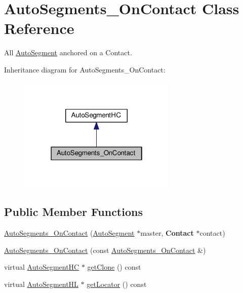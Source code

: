 \hypertarget{classKatabatic_1_1AutoSegments__OnContact}{}\section{Auto\+Segments\+\_\+\+On\+Contact Class Reference}
\label{classKatabatic_1_1AutoSegments__OnContact}


All \hyperlink{classKatabatic_1_1AutoSegment}{Auto\+Segment} anchored on a Contact.  




Inheritance diagram for Auto\+Segments\+\_\+\+On\+Contact\+:\nopagebreak
\begin{figure}[H]
\begin{center}
\leavevmode
\includegraphics[width=214pt]{classKatabatic_1_1AutoSegments__OnContact__inherit__graph}
\end{center}
\end{figure}
\subsection*{Public Member Functions}
\begin{DoxyCompactItemize}
\item 
\hyperlink{classKatabatic_1_1AutoSegments__OnContact_af3f727d0c0fe394da508f52a6c9e4b90}{Auto\+Segments\+\_\+\+On\+Contact} (\hyperlink{classKatabatic_1_1AutoSegment}{Auto\+Segment} $\ast$master, \textbf{ Contact} $\ast$contact)
\item 
\hyperlink{classKatabatic_1_1AutoSegments__OnContact_ab6ff1773c5335fe496f61f2703a5ac99}{Auto\+Segments\+\_\+\+On\+Contact} (const \hyperlink{classKatabatic_1_1AutoSegments__OnContact}{Auto\+Segments\+\_\+\+On\+Contact} \&)
\item 
virtual \hyperlink{namespaceKatabatic_acb3628dc7705fefe38a665cfe43efa6e}{Auto\+Segment\+HC} $\ast$ \hyperlink{classKatabatic_1_1AutoSegments__OnContact_a5b26b0698bdcb40cbf51b250dfb21858}{get\+Clone} () const
\item 
virtual \hyperlink{namespaceKatabatic_a40ef13471fd0e797b75d3c436813fe65}{Auto\+Segment\+HL} $\ast$ \hyperlink{classKatabatic_1_1AutoSegments__OnContact_a07665c070fcc269aec02ce842f384483}{get\+Locator} () const
\end{DoxyCompactItemize}


